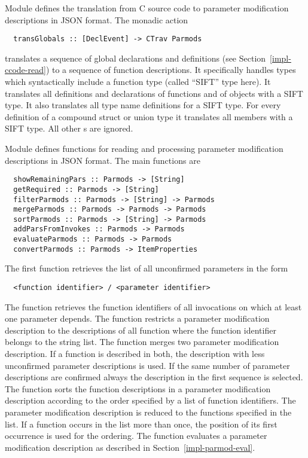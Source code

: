 Module  defines the translation from C source code to parameter modification descriptions
in JSON format. The monadic action
\begin{verbatim}
  transGlobals :: [DeclEvent] -> CTrav Parmods
\end{verbatim}
translates a sequence of global declarations and definitions (see Section~\ref{impl-ccode-read}) to a sequence of
function descriptions. It specifically handles types which syntactically include a function type (called ``SIFT'' type here).
It translates all definitions and declarations of functions and of objects with a SIFT type. It also translates all type 
name definitions for a SIFT type.
For every definition of a compound struct or union type it translates all members with a SIFT type.
All other s are ignored.

Module  defines functions for reading and processing parameter modification descriptions in JSON format.
The main functions are 
\begin{verbatim}
  showRemainingPars :: Parmods -> [String]
  getRequired :: Parmods -> [String]
  filterParmods :: Parmods -> [String] -> Parmods
  mergeParmods :: Parmods -> Parmods -> Parmods
  sortParmods :: Parmods -> [String] -> Parmods
  addParsFromInvokes :: Parmods -> Parmods
  evaluateParmods :: Parmods -> Parmods
  convertParmods :: Parmods -> ItemProperties
\end{verbatim}
The first function retrieves the list of all unconfirmed parameters in the form
\begin{verbatim}
  <function identifier> / <parameter identifier>
\end{verbatim}
The function  retrieves the function identifiers of all invocations on which at least one parameter depends.
The function  restricts a parameter modification description to the descriptions of all function
where the function identifier belongs to the string list. 
The function  merges two parameter modification description. If a function is described in both, the description
with less unconfirmed parameter descriptions is used. If the same number of parameter descriptions are confirmed 
always the description in the first sequence is selected. The function  sorts the function descriptions
in a parameter modification description according to the order specified by a list of function identifiers. The parameter
modification description is reduced to the functions specified in the list. If a function occurs in the list more than once, 
the position of its first occurrence is used for the ordering.
The function  evaluates a parameter modification description as described in 
Section~\ref{impl-parmod-eval}. 

